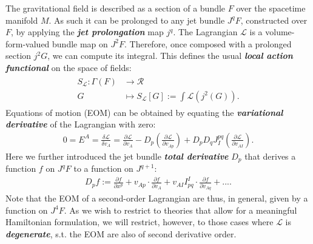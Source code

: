 \documentclass[%
preprint,
titlepage,
nofootinbib,
amsmath,amssymb,
showkeys,
aps,
prd,
floatfix,
]{revtex4-2}
\begin{document}
The gravitational field is described as a section of a bundle $F$ over the spacetime manifold $M$. As such it can be prolonged to any jet bundle $J^qF$, constructed over $F$, by applying the \textit{\textbf{jet prolongation}} map $j^q$. 
The Lagrangian $\mathcal{L}$ is a volume-form-valued bundle map on $J^2F$. Therefore, once composed with a prolonged section $j^2G$, we can compute its integral.
This defines the usual \textit{\textbf{local action functional}} on the space of fields:
\begin{align}
\begin{aligned}
    S_{\mathcal{L}} : \Gamma(F) &\longrightarrow \mathcal{R} \\
    G &\longmapsto S_{\mathcal{L}}[G] := \int \mathcal{L}(j^2(G)).
\end{aligned}
\end{align}
Equations of motion (EOM) can be obtained by equating the \textit{\textbf{variational derivative}} of the Lagrangian with zero:
\begin{align}
  0 = E^A = \frac{\delta \mathcal{L}}{\delta v_A} = 
  \frac{\partial\mathcal{L}}{\partial v_A} - D_p ( \frac{\partial \mathcal{L}}{\partial v_{Ap}}) 
  + D_p D_q J^{pq}_I (\frac{\partial \mathcal{L}}{\partial v_{AI}}).
\end{align}
Here we further introduced the jet bundle \textit{\textbf{total derivative}} $D_p$ that
derives a function $f$ on $J^qF$ to a function on $J^{q+1}$:
\begin{align}
    D_p f := \frac{\partial f}{\partial x^p} + v_{Ap} \cdot  \frac{\partial f}{\partial v_A} + v_{AI} I^{I}_{pq} \cdot \frac{\partial f}{ \partial v_{Aq}}+... .
\end{align}
Note that the EOM of a second-order Lagrangian are thus, in general, given by a function on $J^4F$. As we wish to restrict to theories that allow for a meaningful Hamiltonian formulation, we will restrict, however, to those cases where $\mathcal{L}$ is \textit{\textbf{degenerate}}, s.t. the EOM are also of second derivative order. 
\end{document}
